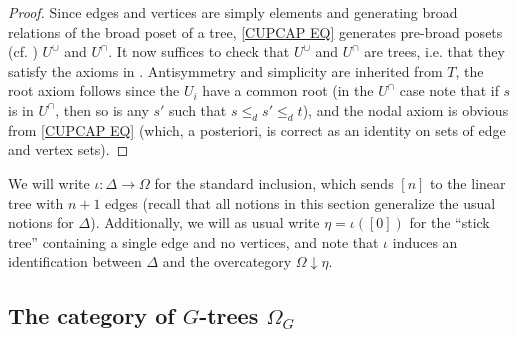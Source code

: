 \documentclass[a4paper,10pt
 ,draft
]{article}%
\begin{document}
\begin{proof}
	Since edges and vertices are simply elements and generating broad relations of the broad poset of a tree,  
	\eqref{CUPCAP EQ} generates pre-broad posets 
	(cf. \cite[Rem. 5.2]{Per18}) $U^{\cup}$ and $U^{\cap}$.
	It now suffices to check that 
	$U^{\cup}$ and $U^{\cap}$ are trees,
	i.e. that they satisfy the axioms in 
	\cite[Defs. 5.1, 5.3, 5.9]{Per18}.
	Antisymmetry and simplicity are inherited from $T$, the root axiom follows since the $U_i$ have a common root (in the $U^{\cap}$ case note that if $s$ is in $U^{\cap}$, then so is any $s'$ such that
	$s \leq_d s' \leq_d t$),
	and the nodal axiom is obvious from \eqref{CUPCAP EQ} (which, a posteriori, is correct as an identity on sets of edge and vertex sets).
\end{proof}

\begin{notation}
      \label{DELTAOMEGA NOT}
We will write $\iota \colon \Delta \to \Omega$ for the standard inclusion, which sends $[n]$ to the linear tree with $n+1$ edges (recall that all notions in this section generalize the usual notions for $\Delta$).
Additionally, we will as usual write $\eta =  \iota([0])$ for the ``stick tree'' containing a single edge and no vertices, and note that $\iota$ induces an identification between $\Delta$ and the overcategory $\Omega \downarrow \eta$.
\end{notation}

\subsection{The category of $G$-trees $\Omega_G$}
\end{document}
